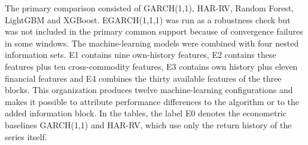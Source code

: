 \documentclass[a4paper,fleqn]{cas-sc}
\begin{document}
The primary comparison consisted of GARCH(1,1), HAR-RV, Random Forest, LightGBM and XGBoost. EGARCH(1,1,1) was run as a robustness check but was not included in the primary common support because of convergence failures in some windows. The machine-learning models were combined with four nested information sets. E1 contains nine own-history features, E2 contains these features plus ten cross-commodity features, E3 contains own history plus eleven financial features and E4 combines the thirty available features of the three blocks. This organization produces twelve machine-learning configurations and makes it possible to attribute performance differences to the algorithm or to the added information block. In the tables, the label E0 denotes the econometric baselines GARCH(1,1) and HAR-RV, which use only the return history of the series itself.
\end{document}
